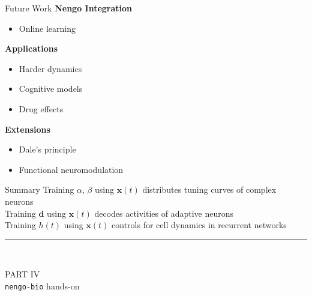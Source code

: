 \documentclass[aspectratio=169]{beamer}
\begin{document}
\begin{frame}{Future Work}
\textbf{Nengo Integration}
\begin{itemize}
    \item Online learning
\end{itemize}
\vspace{0.5cm}
\textbf{Applications}
\begin{itemize}
    \item Harder dynamics
    \item Cognitive models
    \item Drug effects
\end{itemize}
\vspace{0.5cm}
\textbf{Extensions}
\begin{itemize}
    \item Dale's principle
    \item Functional neuromodulation
\end{itemize}
\end{frame}

\begin{frame}{Summary}
Training $\alpha$, $\beta$ using $\mathbf{x}(t)$ distributes tuning curves of complex neurons \\
\vspace{0.5cm}
Training $\mathbf{d}$ using $\mathbf{x}(t)$ decodes activities of adaptive neurons \\
\vspace{0.5cm}
Training $h(t)$ using $\mathbf{x}(t)$ controls for cell dynamics in recurrent networks \\
\vspace{0.5cm}
\rule{\textwidth}{1pt}
{} \\
\end{frame}

\begin{frame}
\centering
\Large\textsc{PART IV}\\[0.5cm]
{\huge\color{violet}\texttt{nengo-bio} hands-on}
\end{frame}
\end{document}
